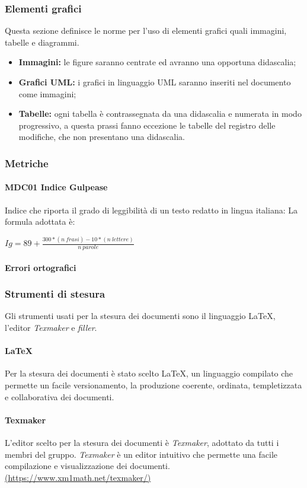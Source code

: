 \subsubsection{Elementi grafici}
Questa sezione definisce le norme per l'uso di elementi grafici quali immagini, tabelle e diagrammi.
\begin{itemize}
\item \textbf{Immagini:} le figure saranno centrate ed avranno una opportuna didascalia;
\item \textbf{Grafici UML:} i grafici in linguaggio UML saranno inseriti nel documento come immagini;
\item \textbf{Tabelle:} ogni tabella è contrassegnata da una didascalia e numerata in modo progressivo, a questa prassi fanno eccezione le tabelle del registro delle modifiche, che non presentano una didascalia.
\end{itemize}
\subsubsection{Metriche}
\paragraph{MDC01 Indice Gulpease}
Indice che riporta il grado di leggibilità di un testo redatto in lingua italiana:
La formula adottata è:\newline
\centerline{\textbf{$Ig= 89 + \frac{300 * (n\ frasi) - 10 * (n\ lettere)}{n\ parole}$}}
\paragraph{Errori ortografici}
\subsubsection{Strumenti di stesura}
Gli strumenti usati per la stesura dei documenti sono il linguaggio \LaTeX, l'editor \textit{Texmaker} e \textit{filler}.
\paragraph{\LaTeX}
Per la stesura dei documenti è stato scelto \LaTeX, un linguaggio compilato che permette un facile versionamento, la produzione coerente, ordinata, templetizzata e collaborativa dei documenti.
\paragraph{Texmaker}
L'editor scelto per la stesura dei documenti è \textit{Texmaker}, adottato da tutti i membri del gruppo. \textit{Texmaker} è un editor intuitivo che permette una facile compilazione e visualizzazione dei documenti.\newline
\url{(https://www.xm1math.net/texmaker/)}
